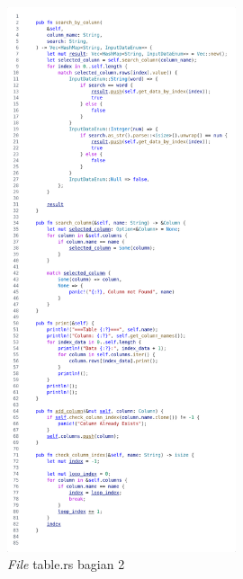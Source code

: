 \begin{figure}[H]
  \centering{}
	\includegraphics[width=0.6\textwidth]{gambar/lampiran/file-table-2.png}
  \caption{\emph{File} table.rs bagian 2}
\end{figure}

